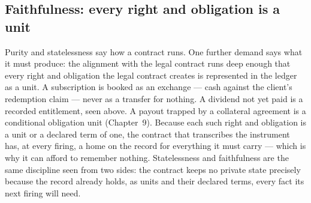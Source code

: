 \subsection{Faithfulness: every right and obligation is a unit}

Purity and statelessness say how a contract runs. One further demand says what it
must produce: the alignment with the legal contract runs deep enough that every
right and obligation the legal contract creates is represented in the ledger as
a unit. A subscription is booked as an exchange --- cash against the client's
redemption claim --- never as a transfer for nothing. A dividend not yet paid is
a recorded entitlement, seen above. A payout trapped by a collateral agreement
is a conditional obligation unit (Chapter~9). Because each such right and
obligation is a unit or a declared term of one, the contract that transcribes
the instrument has, at every firing, a home on the record for everything it must
carry --- which is why it can afford to remember nothing. Statelessness and
faithfulness are the same discipline seen from two sides: the contract keeps no
private state precisely because the record already holds, as units and their
declared terms, every fact its next firing will need.
